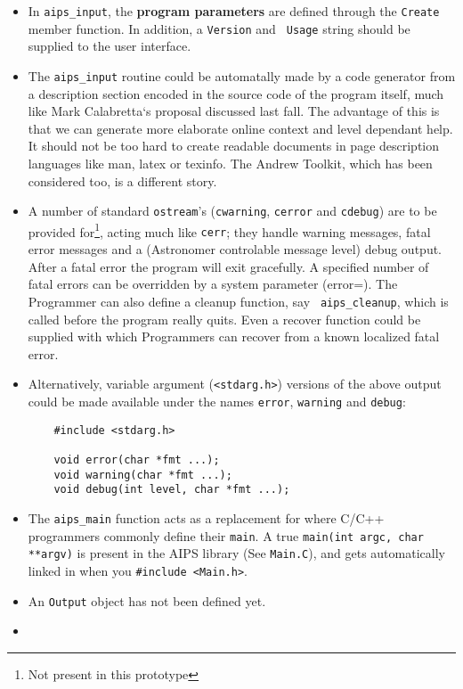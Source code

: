 \begin{itemize}
\item
In {\tt aips\_input}, the {\bf program parameters} are defined through
the {\tt Create} member function.  In addition, a {\tt Version} and {\tt
Usage} string should be supplied to the user interface. 


\item

The {\tt aips\_input} routine could be automatally made by a code
generator from a description section encoded in the source code of the
program itself, much like Mark Calabretta`s proposal discussed last
fall.  The advantage of this is that we can generate more elaborate
online context and level dependant help.  It should not be too hard to
create readable documents in page description languages like man, latex
or texinfo.  The Andrew Toolkit, which has been considered too, is a
different story. 

\item

A number of standard {\tt ostream}'s ({\tt cwarning}, {\tt cerror} and
{\tt cdebug}) are to be provided for\footnote{Not present in this
prototype}, acting much like {\tt cerr}; they handle warning messages,
fatal error messages and a (Astronomer controlable message level) debug
output.  After a fatal error the program will exit gracefully.  A
specified number of fatal errors can be overridden by a system parameter
(error=).  The Programmer can also define a cleanup function, say {\tt
aips\_cleanup}, which is called before the program really quits.  Even a
recover function could be supplied with which Programmers can recover
from a known localized fatal error. 

\item
Alternatively, variable argument ({\tt <stdarg.h>}) versions of
the above output could be made available under the names {\tt error},
{\tt warning} and {\tt debug}:

\begin{verbatim}
    #include <stdarg.h>

    void error(char *fmt ...);
    void warning(char *fmt ...);
    void debug(int level, char *fmt ...);
\end{verbatim}

\item
The {\tt aips\_main} function acts as a replacement for where C/C++ programmers
commonly define their {\tt main}. A true {\tt main(int argc, char **argv)} is
present in the AIPS library (See {\tt Main.C}), and gets automatically linked in
when you \verb+#include <Main.h>+. 

\item
An {\tt Output} object has not been defined yet. 

\item

\end{itemize}


